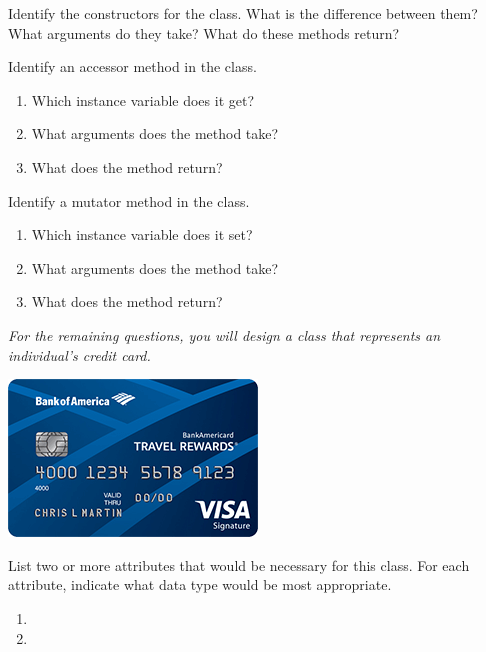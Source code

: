 

\Q Identify the constructors for the  class. What is the difference between them? What arguments do they take? What do these methods return?

\begin{answer}
\end{answer}


\Q Identify an accessor method in the  class. 
\begin{enumerate}[itemsep=0pt]
\item Which instance variable does it get?
\item What arguments does the method take?
\item What does the method return?
\end{enumerate}


\Q Identify a mutator method in the  class.
\begin{enumerate}[itemsep=0pt]
\item Which instance variable does it set?
\item What arguments does the method take?
\item What does the method return?
\end{enumerate}


\begin{center}
\textit{For the remaining questions, you will design a class that represents an individual's credit card.}
\bigskip\par
\includegraphics{CS1B/credit-card.png}
\end{center}


\Q List two or more attributes that would be necessary for this  class. For each attribute, indicate what data type would be most appropriate.

\begin{enumerate}
\item 
\item 
\end{enumerate}


